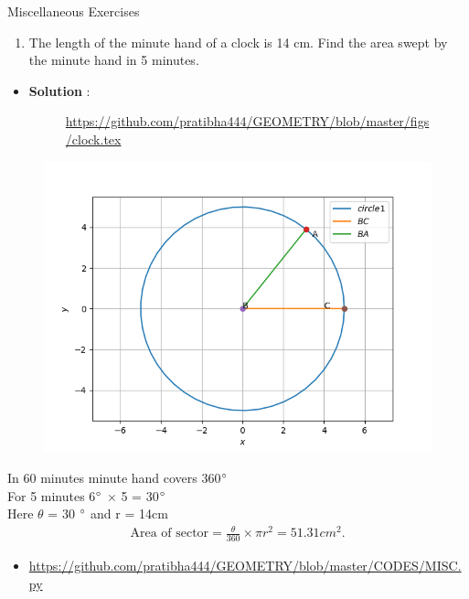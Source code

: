 \begin{frame}{Miscellaneous Exercises}
\begin{enumerate}
\conti
\item The length of the
minute hand of a clock is 14 cm. Find the area
swept by the minute hand in 5 minutes.\\
\seti
\end{enumerate}
\begin{itemize}
\item \textbf{Solution} :
\begin{figure}[!ht]
\resizebox{0.2\linewidth}{!}
{

}
\url{https://github.com/pratibha444/GEOMETRY/blob/master/figs/clock.tex}
\end{figure}


\end{itemize}
\end{frame}
\begin{frame}
\begin{figure}
\includegraphics[scale=.6]{./CODES/misc.png}
\end{figure}
\end{frame}
\begin{frame}

 In 60 minutes minute hand covers  360$\degree$\\
For 5 minutes 6$\degree$ $\times$ 5 = 30$\degree$\\ 
Here $\theta$ = 30 $\degree$ and r = 14cm\\

\begin{align*}
	\text{Area of sector} = \frac{\theta}{360} \times \pi r^2
	=51.31cm^2.
\end{align*}   
\begin{itemize}
\item \url {https://github.com/pratibha444/GEOMETRY/blob/master/CODES/MISC.py} 
\end{itemize}             
\end{frame}